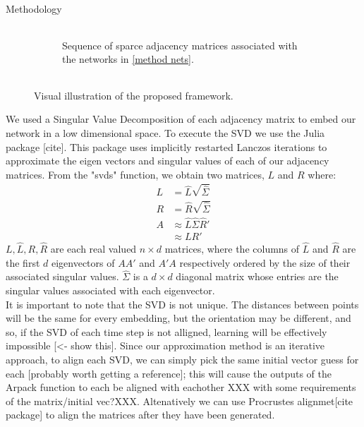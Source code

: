 \documentclass[12pt]{amsart}
\begin{document}
\begin{section}{Methodology}
\begin{figure}
\begin{subfigure}[c]{1\textwidth}
\begin{tabular}{llll}
        \end{tabular}
        \caption{Sequence of sparce adjacency matrices associated with the networks in \autoref{method nets}.}
        \label{method adjacency}
    \end{subfigure}

        \begin{tabular}{llll}

        \end{tabular}

        \caption{Visual illustration of the proposed framework.}
        \label{framework illustration}
    \end{figure}
    
    We used a Singular Value Decomposition of each adjacency matrix to embed our network in a low dimensional space. To execute the SVD\cite{golub1971singular} we use the Julia package [cite]. This package uses implicitly restarted Lanczos iterations\cite{lehoucq1996deflation} to approximate the eigen vectors and singular values of each of our adjacency matrices. From the "svds" function, we obtain two matrices, $L$ and $R$ where:\\
    \begin{align}
        L&=\hat L \sqrt{\hat \Sigma }\\
        R &= \hat R \sqrt{\hat \Sigma }\\
        A &\approx \hat L \hat \Sigma \hat R'\\
        &\approx LR'
    \end{align}
    $L,\hat L, R, \hat R$ are each real valued $n\times d$ matrices, where the columns of $\hat L$ and $\hat R$ are the first $d$ eigenvectors of $AA'$ and $A'A$ respectively ordered by the size of their associated singular values. $\hat \Sigma$ is a $d\times d$ diagonal matrix whose entries are the singular values associated with each eigenvector. \\
    It is important to note that the SVD is not unique. The distances between points will be the same for every embedding, but the orientation may be different, and so, if the SVD of each time step is not alligned, learning will be effectively impossible [<- show this]. Since our approximation method is an iterative approach, to align each SVD, we can simply pick the same initial vector guess for each [probably worth getting a reference]; this will cause the outputs of the Arpack function to each be aligned with eachother XXX with some requirements of the matrix/initial vec?XXX. Altenatively we can use Procrustes alignmet[cite package] to align the matrices after they have been generated.\\

\end{section}
\end{document}
